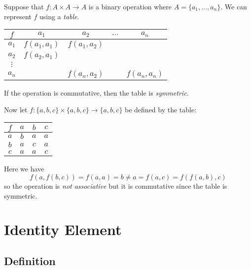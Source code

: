 \documentclass[11pt]{article}
\begin{document}
    Suppose that \(f: A \times A \rightarrow A\) is a binary operation where \(A = \{a_1, \dots, a_n\}\). We can represent $f$ using a \emph{table}.
    \begin{center}
        \begin{tabular}{| c | c | c | c | c |} \hline
            $f$      & $a_1$        & $a_2$        & $\dots$ & $a_n$        \\ \hline
            $a_1$    & $f(a_1,a_1)$ & $f(a_1,a_2)$ &         &              \\ \hline
            $a_2$    & $f(a_2,a_1)$ &              &         &              \\ \hline
            $\vdots$ &              &              &         &              \\ \hline
            $a_n$    &              & $f(a_n,a_2)$ &         & $f(a_n,a_n)$ \\ \hline
            
        \end{tabular}
    \end{center}
    If the operation is commutative, then the table is \emph{symmetric.}

    Now let \(f: \{a,b,c\} \times \{a,b,c\} \rightarrow \{a,b,c\}\) be defined by the table:
    \begin{center}
        \begin{tabular}{| c | c | c | c |} \hline
            $f$ & $a$ & $b$ & $c$ \\ \hline
            $a$ & $b$ & $a$ & $a$ \\ \hline
            $b$ & $a$ & $c$ & $a$ \\ \hline
            $c$ & $a$ & $a$ & $c$ \\ \hline
        \end{tabular}
    \end{center}
    Here we have \[f(a,f(b,c)) = f(a,a) = b \neq a = f(a,c) = f(f(a,b),c)\] so the operation is \emph{not associative} but it is commutative since the table is symmetric.

    \pagebreak

    \section{Identity Element}

    \subsection{Definition}
\end{document}
